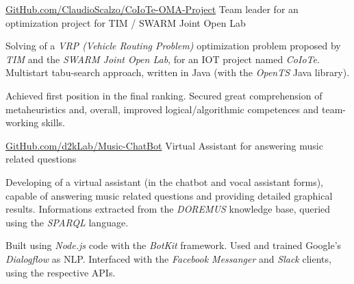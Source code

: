 



\begin{cventries}

	\cvproj
		{\href{https://github.com/claudioscalzo/coiote-oma-project}{GitHub.com/ClaudioScalzo/CoIoTe-OMA-Project}}
		{Team leader for an optimization project for TIM / SWARM Joint Open Lab}
		{}
		{}
		{
			\begin{cvitems} %
				\item {Solving of a \textit{VRP (Vehicle Routing Problem)} optimization problem proposed by \textit{TIM} and the \textit{SWARM Joint Open Lab}, for an IOT project named \textit{CoIoTe}. Multistart tabu-search approach, written in Java (with the \textit{OpenTS} Java library).}
				\item {Achieved first position in the final ranking. Secured great comprehension of metaheuristics and, overall, improved logical/algorithmic competences and team-working skills.}
			\end{cvitems}
		}

	\cvproj
		{\href{https://github.com/D2KLab/music-chatbot}{GitHub.com/d2kLab/Music-ChatBot}}
		{Virtual Assistant for answering music related questions}
		{}
		{}
		{
			\begin{cvitems} %
				\item {Developing of a virtual assistant (in the chatbot and vocal assistant forms), capable of answering music related questions and providing detailed graphical results. Informations extracted from the \textit{DOREMUS} knowledge base, queried using the \textit{SPARQL} language.}
				\item {Built using \textit{Node.js} code with the \textit{BotKit} framework. Used and trained Google's \textit{Dialogflow} as NLP. Interfaced with the \textit{Facebook Messanger} and \textit{Slack} clients, using the respective APIs.}
			\end{cvitems}
		}
	

\end{cventries}
